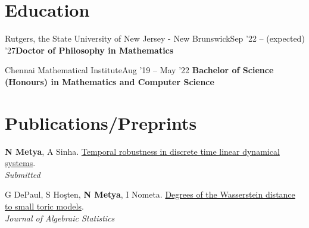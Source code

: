 \section{Education}
\resumeSubheading
{Rutgers, the State University of New Jersey - New Brunswick}{Sep '22 -- (expected) '27}{\vspace{-13pt}\color{grey}\textbf{Doctor of Philosophy in Mathematics}
}{}
\vspace{-5pt}

\resumeSubheading
{Chennai Mathematical Institute}{Aug '19 -- May '22}
{\vspace{-13pt}\color{grey}\textbf{Bachelor of Science (Honours) in Mathematics and Computer Science} }{}
\vspace{-15pt}
      

\section{Publications/Preprints}
\begin{etaremune}[leftmargin=13pt]
\item {\color{grey}\textbf{N Metya}, A Sinha}. \href{https://arxiv.org/abs/2505.02347}{Temporal robustness in discrete time linear dynamical systems}. \\
\textit{Submitted}\vspace{-5pt}
\item {\color{grey}G DePaul, S Ho\c{s}ten, \textbf{N Metya}, I Nometa}. \href{https://arxiv.org/abs/2402.09626}{Degrees of the Wasserstein distance to small toric models}. \\
\textit{Journal of Algebraic Statistics} 
\end{etaremune}

\vspace{-15pt}







